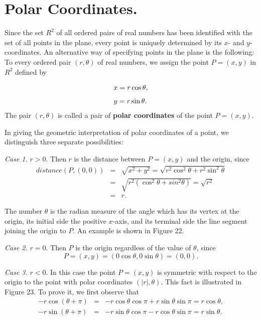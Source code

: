 \section{Polar Coordinates.} Since the set $R^2$ of all ordered pairs of real numbers has been identified with the set of all points in the plane, every point is uniquely determined by its $x$- and $y$-coordinates. An alternative way of specifying points in the plane is the following: To every ordered pair $(r, \theta)$ of real numbers, we assign the point $P = (x, y)$ in $R^2$ defined by

\begin{equation} 
\begin{array}{l}        
x = r\cos \theta, \vspace{.1in}   \\
y = r\sin \theta. 
\end{array}
\label{eq10.6.1}
\end{equation}
The pair $(r, \theta)$ is called a pair of \textbf{polar coordinates} of the point $P = (x, y)$.

In giving the geometric interpretation of polar coordinates of a point, we distinguish three separate possibilities:

\textit{Case 1.} $r > 0$. Then $r$ is the distance between $P = (x, y)$ and the origin, since 
\begin{eqnarray*}
distance(P, (0, 0)) 
&=& \sqrt{x^2 + y^2} = \sqrt{r^2\cos^2 \theta + r^2 \sin^2 \theta} \\ 
&=& \sqrt{r^2(\cos^2 \theta + sin^2 \theta)} = \sqrt{r^2} \\
&=& r.
\end{eqnarray*}

\noindent The number $\theta$ is the radian measure of the angle which has its vertex at the origin, its initial side the positive $x$-axis, and its terminal side the line segment joining the origin to $P$. An example is shown in Figure 22.

\textit{Case 2.} $r = 0$. Then $P$ is the origin regardless of the value of $\theta$, since 
$$
P = (x, y) = (0 \cos \theta, 0 \sin \theta) = (0, 0).
$$
\setcounter{figure}{21}

\textit{Case 3.} $r < 0$. In this case the point $P = (x, y)$ is symmetric with respect to the origin to the point with polar coordinates $(|r|, \theta)$. This fact is illustrated in Figure 23. To prove it, we first observe that
\begin{eqnarray*}
-r \cos(\theta + \pi) &=& -r \cos \theta \cos \pi + r \sin \theta \sin \pi = r \cos \theta, \\
-r \sin(\theta + \pi) &=& -r \sin \theta \cos \pi  - r\cos \theta \sin \pi = r \sin \theta.
\end{eqnarray*}

